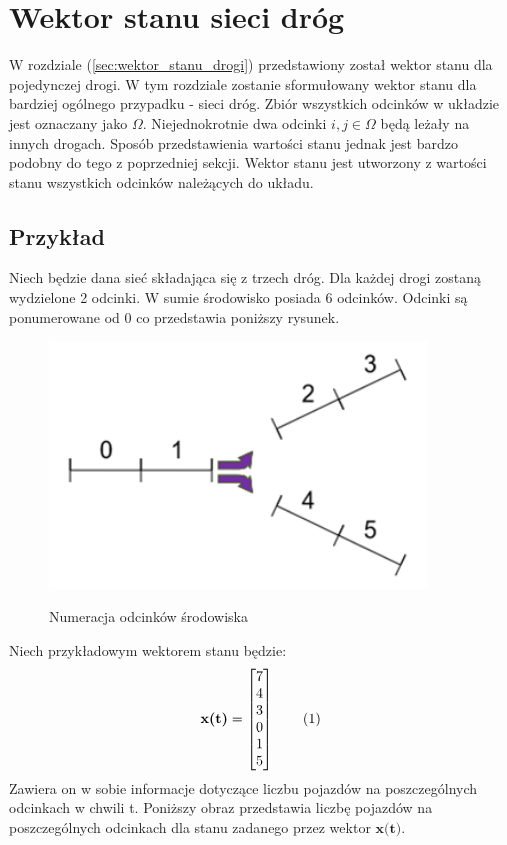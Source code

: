 \documentclass[12pt]{book}
\theoremstyle{plain}
\newcommand\addtag{\refstepcounter{equation}
\renewcommand{\labelenumii}{\theenumii}
\renewcommand{\theenumii}{\theenumi.\arabic{enumii}.}
\tag{\theequation}}
\begin{document}
\section {Wektor stanu sieci dróg}
W rozdziale (\ref{sec:wektor_stanu_drogi}) przedstawiony został wektor stanu dla pojedynczej drogi. W tym rozdziale zostanie sformułowany wektor stanu dla bardziej ogólnego przypadku - sieci dróg. Zbiór wszystkich odcinków w układzie jest oznaczany jako $\Omega$. Niejednokrotnie dwa odcinki $i,j \in \Omega$ będą leżały na innych drogach. Sposób przedstawienia wartości stanu jednak jest bardzo podobny do tego z poprzedniej sekcji. Wektor stanu jest utworzony z wartości stanu wszystkich odcinków należących do układu.
\subsection*{Przykład} \label{subsec:wektor_stanu_siec_przyklad}
Niech będzie dana sieć składająca się z trzech dróg. Dla każdej drogi zostaną wydzielone 2 odcinki. W sumie środowisko posiada 6 odcinków. Odcinki są ponumerowane od 0 co przedstawia poniższy rysunek.
\def \xzero {\begin{bmatrix}
		7 \\ 4 \\ 3 \\ 0 \\ 1 \\ 5
\end{bmatrix}}
	\begin{figure}[H]
	\centering
	\includegraphics[width=10cm]{images/env_11}
	\label{fig:env_11}
	\caption{Numeracja odcinków środowiska}
\end{figure}Niech przykładowym wektorem stanu będzie:
\[\textbf{x(t)}=\xzero \addtag \]
Zawiera on w sobie informacje dotyczące liczbu pojazdów na poszczególnych odcinkach w chwili t. Poniższy obraz przedstawia liczbę pojazdów na poszczególnych odcinkach dla stanu zadanego przez wektor $\textbf{x(t)}$.
\end{document}
